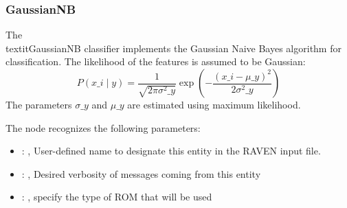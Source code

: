 \subsubsection{GaussianNB}
  The \\textit{GaussianNB} classifier implements the Gaussian Naive Bayes
  algorithm for classification.                          The likelihood of the features is assumed
  to be Gaussian:                          \begin{equation}                              P(x\_i \mid
  y) = \frac{1}{\sqrt{2\pi\sigma^2\_y}} \exp\left(-\frac{(x\_i -
  \mu\_y)^2}{2\sigma^2\_y}\right)                          \end{equation}                          The
  parameters $\sigma\_y$ and $\mu\_y$ are estimated using maximum likelihood.

  The  node recognizes the following parameters:
    \begin{itemize}
      \item {}: , 
        User-defined name to designate this entity in the RAVEN input file.
      \item {}: , 
        Desired verbosity of messages coming from this entity
      \item {}: , 
        specify the type of ROM that will be used
  \end{itemize}

